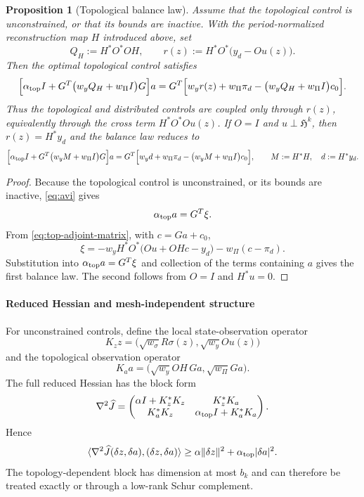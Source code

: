\documentclass{article}
\newtheorem{proposition}{Proposition}[section]
\newcommand{\HH}{\mathfrak H}
\newcommand{\ip}[2]{\langle #1,#2\rangle}
\newcommand{\norm}[1]{\lVert #1\rVert}
\begin{document}
\begin{proposition}[Topological balance law]\label{prop:balance}
Assume that the topological control is unconstrained, or that its bounds are
inactive. With the period-normalized reconstruction map $H$ introduced above,
set
\[
 Q_H:=H^{*}O^{*}OH,
 \qquad
 r(z):=H^{*}O^{*}\bigl(y_d-Ou(z)\bigr).
\]
Then the optimal topological control satisfies
\[
 \Bigl[\alpha_{\rm top}I+G^{T}\bigl(w_yQ_H+w_{\Pi}I\bigr)G\Bigr]a
 =
 G^{T}\Bigl[
   w_y r(z)+w_{\Pi}\pi_d
   -\bigl(w_yQ_H+w_{\Pi}I\bigr)c_0
 \Bigr].
\]
Thus the topological and distributed controls are coupled only through
$r(z)$, equivalently through the cross term
$H^{*}O^{*}Ou(z)$. If $O=I$ and $u\perp\HH^{k}$, then
$r(z)=H^{*}y_d$ and the balance law reduces to
\[
 \Bigl[\alpha_{\rm top}I+G^{T}\bigl(w_yM+w_{\Pi}I\bigr)G\Bigr]a
 =
 G^{T}\Bigl[
   w_y d+w_{\Pi}\pi_d
   -\bigl(w_yM+w_{\Pi}I\bigr)c_0
 \Bigr],
 \qquad
 M:=H^{*}H,\quad d:=H^{*}y_d.
\]
\end{proposition}

\begin{proof}
Because the topological control is unconstrained, or its bounds are inactive,
\eqref{eq:avi} gives
\[
 \alpha_{\rm top}a=G^{T}\xi.
\]
From \eqref{eq:top-adjoint-matrix}, with $c=Ga+c_0$,
\[
 \xi
 =
 -w_yH^{*}O^{*}\bigl(Ou+OHc-y_d\bigr)
 -w_{\Pi}(c-\pi_d).
\]
Substitution into $\alpha_{\rm top}a=G^{T}\xi$ and collection of the terms
containing $a$ gives the first balance law. The second follows from $O=I$ and
$H^{*}u=0$.
\end{proof}
\paragraph{Reduced Hessian and mesh-independent structure}
For unconstrained controls, define the local state-observation operator
\[
 K_z z=\big(\sqrt{w_\sigma}R\sigma(z),\sqrt{w_y}Ou(z)\big)
\]
and the topological observation operator
\[
 K_a a=\big(\sqrt{w_y}OH\,Ga,\sqrt{w_\Pi}Ga\big).
\]
The full reduced Hessian has the block form
\begin{equation}\label{eq:reduced-hessian}
 \nabla^2\widehat J=
 \begin{pmatrix}
 \alpha I+K_z^*K_z & K_z^*K_a\\
 K_a^*K_z & \alpha_{\rm top}I+K_a^*K_a
 \end{pmatrix}.
\end{equation}
Hence
\begin{equation}\label{eq:hessian-lower}
 \ip{\nabla^2\widehat J(\delta z,\delta a)}{(\delta z,\delta a)}
 \ge \alpha\norm{\delta z}^2+\alpha_{\rm top}|\delta a|^2.
\end{equation}
The topology-dependent block has dimension at most $b_k$ and can therefore be treated exactly or through a low-rank Schur complement.
\end{document}
